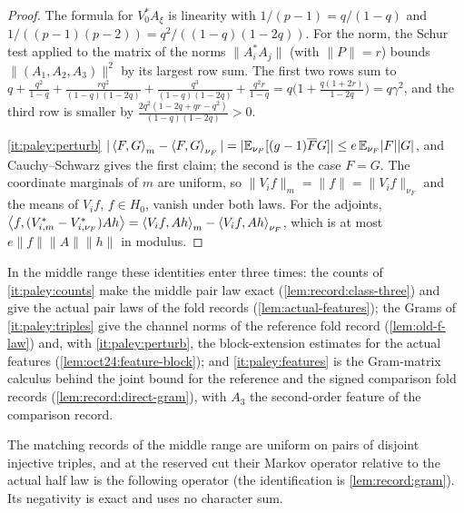 \begin{proof}
The formula for $V_0^*A_\xi$ is linearity with $1/(p-1)=q/(1-q)$ and
$1/((p-1)(p-2))=q^2/((1-q)(1-2q))$. For the norm, the Schur test applied to the
matrix of the norms $\|A_i^*A_j\|$ (with $\|P\|=r$) bounds
$\|(A_1,A_2,A_3)\|^2$ by its largest row sum. The first two rows sum to
$q+\frac{q^2}{1-q}+\frac{rq^2}{(1-q)(1-2q)}+\frac{q^3}{(1-q)(1-2q)}+\frac{q^2r}{1-q}
=q\bigl(1+\frac{q(1+2r)}{1-2q}\bigr)=q\gamma^2$, and the third row is smaller by
$\frac{2q^2(1-2q+qr-q^2)}{(1-q)(1-2q)}>0$.

\ref{it:paley:perturb} $|\left\langle F,G\right\rangle_m-\left\langle F,G\right\rangle_{\nu_F}|=|\mathbb E_{\nu_F}[(g-1)\overline FG]|\le
e\,\mathbb E_{\nu_F}|F||G|$, and Cauchy--Schwarz gives the first claim; the second is
the case $F=G$. The coordinate marginals of $m$ are uniform, so
$\|V_if\|_m=\|f\|=\|V_if\|_{\nu_F}$ and the means of $V_if$, $f\in H_0$, vanish under
both laws. For the adjoints,
$\left\langle f,(V_{i,m}^*-V_{i,\nu_F}^*)Ah\right\rangle=\left\langle V_if,Ah\right\rangle_m-\left\langle V_if,Ah\right\rangle_{\nu_F}$, which is at
most $e\|f\|\|A\|\|h\|$ in modulus.
\end{proof}

In the middle range these identities enter three times: the counts of
\ref{it:paley:counts} make the middle pair law exact
(\cref{lem:record:class-three}) and give the actual pair laws of the fold
records (\cref{lem:actual-features}); the Grams of \ref{it:paley:triples} give
the channel norms of the reference fold record (\cref{lem:old-f-law}) and, with
\ref{it:paley:perturb}, the block-extension estimates for the actual features (\cref{lem:oct24:feature-block});
and \ref{it:paley:features} is the Gram-matrix calculus behind the
joint bound for the reference and the signed comparison fold
records (\cref{lem:record:direct-gram}), with $A_3$ the second-order feature of the
comparison record.

The matching records of the middle range are uniform on pairs of disjoint
injective triples, and at the reserved cut their Markov operator relative to
the actual half law is the following operator (the identification is \cref{lem:record:gram}). Its negativity is exact and
uses no character sum.

